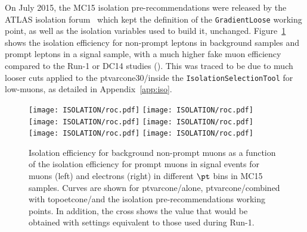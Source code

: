 
On July 2015, the MC15 isolation pre-recommendations were released by the ATLAS isolation forum~\cite{IsoSel_twiki} which kept 
the definition of the {\tt GradientLoose} working point, as well as the isolation variables used to build it, unchanged. 
Figure~\ref{fig:isoMC15} shows the isolation efficiency for non-prompt leptons in background samples and prompt leptons in a signal sample, with a much higher fake muon efficiency compared to the Run-1 or DC14 studies (\cite{NoteDC14}). 
This was traced to be due to much looser cuts applied to the ptvarcone30/\pt inside the {\tt IsolationSelectionTool} 
for low-\pt muons, as detailed in Appendix~\ref{app:iso}.

\begin{figure}[phtb!]
\begin{center}
\texttt{[image: ISOLATION/roc.pdf]}
\texttt{[image: ISOLATION/roc.pdf]}
\texttt{[image: ISOLATION/roc.pdf]}
\texttt{[image: ISOLATION/roc.pdf]}
\texttt{[image: ISOLATION/roc.pdf]}
\texttt{[image: ISOLATION/roc.pdf]}
\end{center}
\vspace{-0.2cm}
\caption{Isolation efficiency for background non-prompt muons as a function of the isolation efficiency for prompt muons in signal events for muons (left) and electrons (right) in different $\pt$ bins in MC15 samples. Curves are shown for ptvarcone/\pt alone, ptvarcone/\pt combined with topoetcone/\pt and the isolation pre-recommendations working points. In addition, the cross shows the value that would be obtained with settings equivalent to those used during Run-1.}
\label{fig:isoMC15}
\end{figure}

